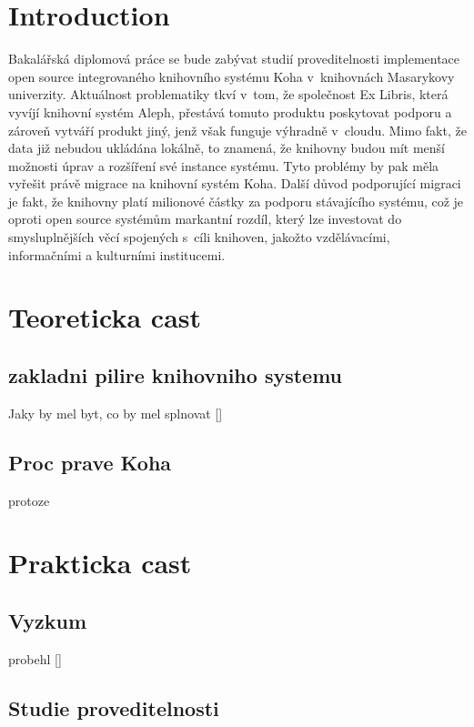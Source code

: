 \documentclass[
	12pt, oneside, printed, final, 
	table,   %
	lof,     %
	lot     %
]{fithesis3}
\newcommand{\citepages}[2]{[\cite[#1]{#2}]}
\newcommand{\citesource}[1]{[\cite{#1}]}
\begin{document}
{\fontsize{12}{18}

\chapter{Introduction}

Bakalářská diplomová práce se bude zabývat studií proveditelnosti implementace 
open source integrovaného knihovního systému Koha v~knihovnách Masarykovy univerzity. 
Aktuálnost problematiky tkví v~tom, že společnost Ex Libris, která vyvíjí knihovní 
systém Aleph, přestává tomuto produktu poskytovat podporu a zároveň vytváří produkt jiný, 
jenž však funguje výhradně v~cloudu. 
Mimo fakt, že data již nebudou ukládána lokálně, to znamená, že knihovny budou mít 
menší možnosti úprav a rozšíření své instance systému. Tyto problémy by pak měla 
vyřešit právě migrace na knihovní systém Koha. 
Další důvod podporující migraci je fakt, že knihovny platí milionové částky za 
podporu stávajícího systému, což je oproti open source systémům markantní rozdíl, 
který lze investovat do smysluplnějších  věcí spojených s~cíli knihoven, 
jakožto vzdělávacími, informačními a kulturními institucemi. 

\chapter{Teoreticka cast }

\section{zakladni pilire knihovniho systemu}

Jaky by mel byt, co by mel splnovat \citepages{10}{Dilhofova2013}

\section{Proc prave Koha}

protoze

\chapter{Prakticka cast}

\section{Vyzkum}

probehl \citesource{Dilhofova2013}

\section{Studie proveditelnosti}

}
\end{document}
